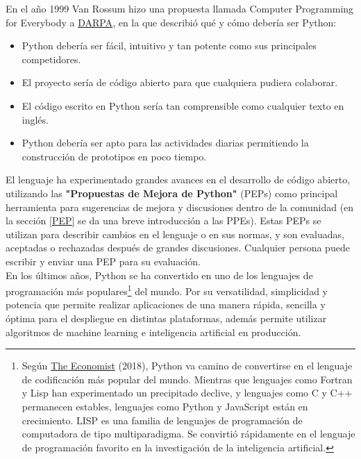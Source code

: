 En el año 1999 Van Rossum hizo una propuesta llamada Computer Programming for Everybody a 
\href{https://es.wikipedia.org/wiki/Agencia_de_Proyectos_de_Investigación_Avanzados_de_Defensa}{\color{vino} DARPA}, en la que describió qué y cómo debería ser Python: 

\begin{itemize}
	\item[] Python debería ser fácil, intuitivo y tan potente como sus principales competidores. 
	\item[] El proyecto sería de código abierto para que cualquiera pudiera colaborar.
	\item[] El código escrito en Python sería tan comprensible como cualquier texto en inglés.
	\item[] Python debería ser apto para las actividades diarias permitiendo la construcción de prototipos en poco tiempo.
\end{itemize}



El lenguaje ha experimentado grandes avances en el desarrollo de código abierto, utilizando 
las {\bf {"Propuestas de Mejora de Python"{}}} (PEPs) como principal herramienta para sugerencias de mejora y discusiones dentro de la comunidad  (en la sección \ref{PEP} se da una breve introducción a las PPEs). Estas PEPs  se utilizan para describir cambios en el lenguaje o en sus normas, y son evaluadas, aceptadas o rechazadas después de grandes discusiones. Cualquier persona puede escribir y enviar una PEP para su evaluación. \\





En los últimos años, Python se ha convertido en uno de los lenguajes de programación más populares\footnote{\scriptsize{Según \href{https://www.economist.com/graphic-detail/2018/07/26/python-is-becoming-the-worlds-most-popular-coding-language}{\color{vino}The Economist} (2018), Python va camino de convertirse en el lenguaje de codificación más popular del mundo. Mientras que lenguajes como Fortran y Lisp  han experimentado un precipitado declive, y lenguajes como C y C++ permanecen estables, lenguajes como Python y JavaScript están en crecimiento. LISP es una familia de lenguajes de programación de computadora de tipo multiparadigma.  Se convirtió rápidamente en el lenguaje de programación favorito en la investigación de la inteligencia artificial.}} del mundo.  Por su versatilidad, simplicidad y potencia que permite realizar aplicaciones de una manera rápida, sencilla y óptima para el despliegue en distintas plataformas, además permite utilizar algoritmos de machine learning e inteligencia artificial en producción. 







